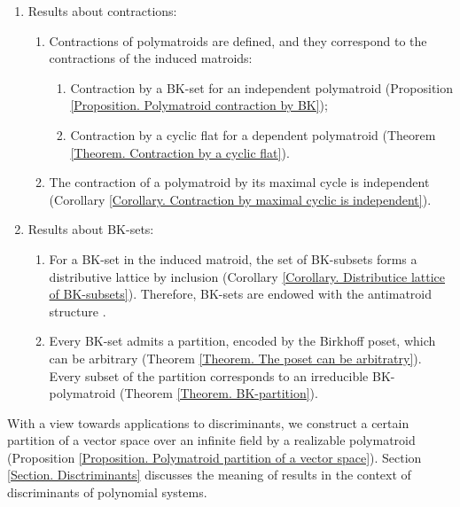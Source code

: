 \documentclass[11pt]{article}
\theoremstyle{plain}
\theoremstyle{definition}
\theoremstyle{remark}
\theoremstyle{plain}
\theoremstyle{plain}
\theoremstyle{plain}
\theoremstyle{definition}
\begin{document}
\begin{enumerate}
\begin{enumerate}
\item All subsets containing a basis of the induced matroid have the same
polymatroid rank (Theorem \ref{Theorem. f(B)=00003Df(E)}).
\item The polymatroid rank equals the induced matroid rank for the ground
set if and only if the bases of the induced matroid are BK-sets (Corollary
\ref{Corollary. rk(E)=00003Df(E) iff bases are BK}).
\end{enumerate}
\item Results about contractions:
\begin{enumerate}
\item Contractions of polymatroids are defined, and they correspond to the
contractions of the induced matroids:
\begin{enumerate}
\item Contraction by a BK-set for an independent polymatroid (Proposition
\ref{Proposition. Polymatroid contraction by BK});
\item Contraction by a cyclic flat for a dependent polymatroid (Theorem
\ref{Theorem. Contraction by a cyclic flat}).
\end{enumerate}
\item The contraction of a polymatroid by its maximal cycle is independent
(Corollary \ref{Corollary. Contraction by maximal cyclic is independent}).
\end{enumerate}
\item Results about BK-sets:
\begin{enumerate}
\item For a BK-set in the induced matroid, the set of BK-subsets forms a
distributive lattice by inclusion (Corollary \ref{Corollary. Distributice lattice of BK-subsets}).
Therefore, BK-sets are endowed with the antimatroid structure \cite{edelman_meet-distributive_1980}.
\item Every BK-set admits a partition, encoded by the Birkhoff poset, which
can be arbitrary (Theorem \ref{Theorem. The poset can be arbitratry}).
Every subset of the partition corresponds to an irreducible BK-polymatroid
(Theorem \ref{Theorem. BK-partition}).
\end{enumerate}
\end{enumerate}
With a view towards applications to discriminants, we construct a
certain partition of a vector space over an infinite field by a realizable
polymatroid (Proposition \ref{Proposition. Polymatroid partition of a vector space}).
Section \ref{Section. Disctriminants} discusses the meaning of results
in the context of discriminants of polynomial systems.
\end{document}
